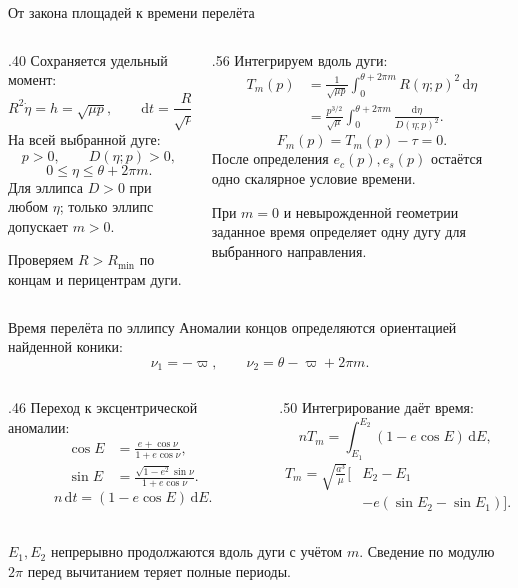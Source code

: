 \documentclass[11pt,aspectratio=169,t]{beamer}
\newcommand{\eqcompact}{\fontsize{10}{12}\selectfont}
\newcommand{\derivationmathspacing}{%
  \setlength{\abovedisplayskip}{2pt}%
  \setlength{\belowdisplayskip}{3pt}%
  \setlength{\abovedisplayshortskip}{2pt}%
  \setlength{\belowdisplayshortskip}{2pt}%
  \setlength{\jot}{2pt}}
\begin{document}
\begin{frame}{От закона площадей к времени перелёта}
\relax\derivationmathspacing
\begin{columns}[T,onlytextwidth]
\begin{column}{.40\textwidth}
Сохраняется удельный момент:
{\eqcompact\derivationmathspacing
\[
 R^2\dot\eta=h=\sqrt{\mu p},
 \qquad \mathrm dt=\frac{R^2}{\sqrt{\mu p}}\,\mathrm d\eta.
\]
}
\justifying
На всей выбранной дуге:
{\eqcompact\derivationmathspacing
\[
 p>0,\qquad D(\eta;p)>0,
\]
\[
 0\le\eta\le\theta+2\pi m.
\]
}
Для эллипса $D>0$ при любом $\eta$; только эллипс допускает $m>0$.
\par\smallskip
Проверяем $R>R_{\min}$ по концам и перицентрам дуги.
\end{column}
\begin{column}{.56\textwidth}
Интегрируем вдоль дуги:
{\eqcompact\derivationmathspacing
\[
 \begin{aligned}
 T_m(p)&=\frac1{\sqrt{\mu p}}
  \int_0^{\theta+2\pi m}R(\eta;p)^2\,\mathrm d\eta\\[5pt]
 &=\frac{p^{3/2}}{\sqrt\mu}
  \int_0^{\theta+2\pi m}\frac{\mathrm d\eta}{D(\eta;p)^2}.
 \end{aligned}
\]
\[
 \boxed{F_m(p)=T_m(p)-\tau=0.}
\]
}
\justifying
После определения $e_c(p),e_s(p)$ остаётся одно скалярное условие времени.
\par\smallskip
При $m=0$ и невырожденной геометрии заданное время определяет одну дугу для выбранного направления.
\end{column}
\end{columns}
\end{frame}

\begin{frame}{Время перелёта по эллипсу}
\relax\derivationmathspacing
Аномалии концов определяются ориентацией найденной коники:
{\eqcompact\derivationmathspacing
\[
 \nu_1=-\varpi,\qquad \nu_2=\theta-\varpi+2\pi m.
\]
}
\begin{columns}[T,onlytextwidth]
\begin{column}{.46\textwidth}
Переход к эксцентрической аномалии:
{\eqcompact\derivationmathspacing
\[
 \begin{aligned}
 \cos E&=\frac{e+\cos\nu}{1+e\cos\nu},\\[4pt]
 \sin E&=\frac{\sqrt{1-e^2}\sin\nu}{1+e\cos\nu}.
 \end{aligned}
\]
\[
 n\,\mathrm dt=(1-e\cos E)\,\mathrm dE.
\]
}
\end{column}
\begin{column}{.50\textwidth}
Интегрирование даёт время:
{\eqcompact\derivationmathspacing
\[
 nT_m=\int_{E_1}^{E_2}(1-e\cos E)\,\mathrm dE,
\]
\[
 \boxed{\begin{aligned}
 T_m=\sqrt{\frac{a^3}{\mu}}\bigl[&E_2-E_1\\[-1pt]
 &-e(\sin E_2-\sin E_1)\bigr].
 \end{aligned}}
\]
}
\end{column}
\end{columns}
\smallskip
\justifying
$E_1,E_2$ непрерывно продолжаются вдоль дуги с учётом $m$.
Сведение по модулю $2\pi$ перед вычитанием теряет полные периоды.
\end{frame}
\end{document}

